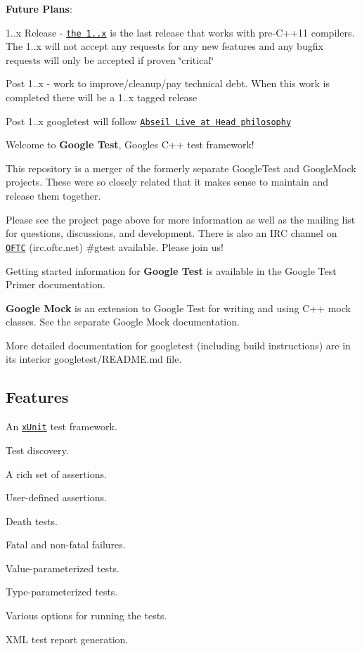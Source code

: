 \href{https://travis-ci.org/google/googletest}{\tt } \href{https://ci.appveyor.com/project/GoogleTestAppVeyor/googletest/branch/master}{\tt }

{\bfseries Future Plans}\+:
\begin{DoxyItemize}
\item 1..\+x Release -\/ \href{https://github.com/google/googletest/releases/tag/release-1.8.1}{\tt the 1..\+x} is the last release that works with pre-\/\+C++11 compilers. The 1..\+x will not accept any requests for any new features and any bugfix requests will only be accepted if proven \char`\"{}critical\char`\"{}
\item Post 1..\+x -\/ work to improve/cleanup/pay technical debt. When this work is completed there will be a 1..\+x tagged release
\item Post 1..\+x googletest will follow \href{https://abseil.io/about/philosophy}{\tt Abseil Live at Head philosophy}
\end{DoxyItemize}

Welcome to {\bfseries Google Test}, Google\textquotesingle{}s C++ test framework!

This repository is a merger of the formerly separate Google\+Test and Google\+Mock projects. These were so closely related that it makes sense to maintain and release them together.

Please see the project page above for more information as well as the mailing list for questions, discussions, and development. There is also an I\+RC channel on \href{https://webchat.oftc.net/}{\tt O\+F\+TC} (irc.\+oftc.\+net) \#gtest available. Please join us!

Getting started information for {\bfseries Google Test} is available in the Google Test Primer documentation.

{\bfseries Google Mock} is an extension to Google Test for writing and using C++ mock classes. See the separate Google Mock documentation.

More detailed documentation for googletest (including build instructions) are in its interior googletest/\+R\+E\+A\+D\+ME.md file.

\subsection*{Features}


\begin{DoxyItemize}
\item An \href{https://en.wikipedia.org/wiki/XUnit}{\tt x\+Unit} test framework.
\item Test discovery.
\item A rich set of assertions.
\item User-\/defined assertions.
\item Death tests.
\item Fatal and non-\/fatal failures.
\item Value-\/parameterized tests.
\item Type-\/parameterized tests.
\item Various options for running the tests.
\item X\+ML test report generation.
\end{DoxyItemize}

